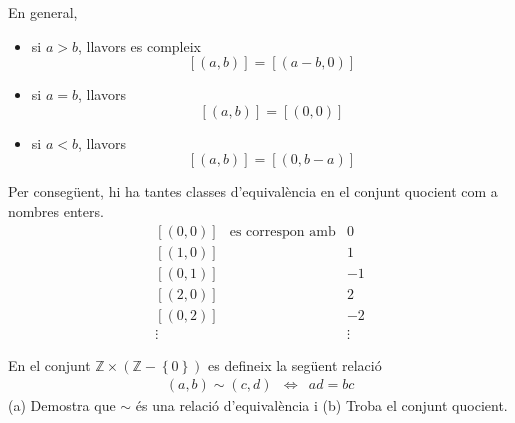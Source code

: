 \begin{solucio}
En general,

\begin{itemize}
\item si $a>b$, llavors es compleix%
\begin{equation*}
\left[ (a,b)\right] =\left[ (a-b,0)\right]
\end{equation*}

\item si $a=b$, llavors%
\begin{equation*}
\left[ (a,b)\right] =\left[ (0,0)\right]
\end{equation*}

\item si $a<b$, llavors%
\begin{equation*}
\left[ (a,b)\right] =\left[ (0,b-a)\right]
\end{equation*}
\end{itemize}

Per conseg\"{u}ent, hi ha tantes classes d'equival\`{e}ncia en el conjunt
quocient com a nombres enters.%
\begin{equation*}
\begin{array}{ccc}
\left[ (0,0)\right] & \text{es correspon amb} & 0 \\
\left[ (1,0)\right] &  & 1 \\
\left[ (0,1)\right] &  & -1 \\
\left[ (2,0)\right] &  & 2 \\
\left[ (0,2)\right] &  & -2 \\
\vdots &  & \vdots%
\end{array}%
\end{equation*}
\end{solucio}

\begin{exercici}
En el conjunt $\mathbb{Z}\times \left( \mathbb{Z}-\left\{ 0\right\} \right) $
es defineix la seg\"{u}ent relaci\'{o}%
\begin{equation*}
\begin{array}{ccc}
(a,b)\sim (c,d) & \Longleftrightarrow & ad=bc%
\end{array}%
\end{equation*}%
(a) Demostra que $\sim $ \'{e}s una relaci\'{o} d'equival\`{e}ncia i (b)
Troba el conjunt quocient.
\end{exercici}

